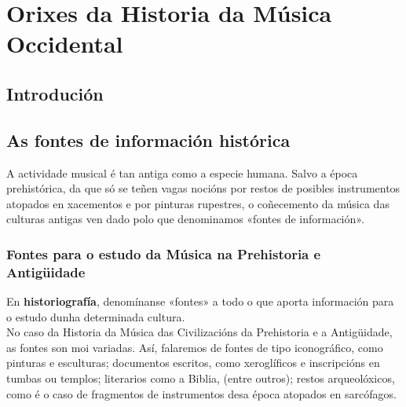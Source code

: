 \documentclass[a4paper, twoside]{templates/ociamthesis}
\begin{document}
\hypertarget{orixes-da-historia-da-muxfasica-occidental}{%
\chapter{Orixes da Historia da Música Occidental}\label{orixes-da-historia-da-muxfasica-occidental}}

\minitoc 

\hypertarget{introduciuxf3n-1}{%
\section*{Introdución}\label{introduciuxf3n-1}}

\hypertarget{as-fontes-de-informaciuxf3n-histuxf3rica-1}{%
\section*{As fontes de información histórica}\label{as-fontes-de-informaciuxf3n-histuxf3rica-1}}

A actividade musical é tan antiga como a especie humana. Salvo a época prehistórica, da que só se teñen vagas nocións por restos de posibles instrumentos atopados en xacementos e por pinturas rupestres, o coñecemento da música das culturas antigas ven dado polo que denominamos «fontes de información».

\hypertarget{fontes-para-o-estudo-da-muxfasica-na-prehistoria-e-antiguxfcidade-1}{%
\subsection*{Fontes para o estudo da Música na Prehistoria e Antigüidade}\label{fontes-para-o-estudo-da-muxfasica-na-prehistoria-e-antiguxfcidade-1}}

En \textbf{historiografía}, denomínanse «fontes» a todo o que aporta información para o estudo dunha determinada cultura.\\
No caso da Historia da Música das Civilizacións da Prehistoria e a Antigüidade, as fontes son moi variadas. Así, falaremos de fontes de tipo iconográfico, como pinturas e esculturas; documentos escritos, como xeroglíficos e inscripcións en tumbas ou templos; literarios como a Biblia, (entre outros); restos arqueolóxicos, como é o caso de fragmentos de instrumentos desa época atopados en sarcófagos.
\end{document}

